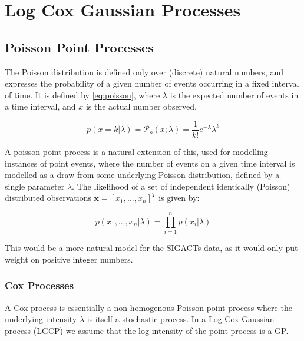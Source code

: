 \documentclass[a4paper,11pt]{report}
\begin{document}

 


\chapter{Log Cox Gaussian Processes}

\section{Poisson Point Processes}
The Poisson distribution is defined only over (discrete) natural numbers, and expresses the probability of a given number of events occurring in a fixed interval of time. It is defined by \ref{eq:poisson}, where \(\lambda\) is the expected number of events in a time interval, and \(x\) is the actual number observed. \cite{Barber}

\begin{equation}\label{eq:poisson}
 p(x=k|\lambda) = \mathcal{P}_o (x;\lambda) = \frac{1}{k!} e^{-\lambda} \lambda^k
\end{equation}

A poisson point process is a natural extension of this, used for modelling instances of point events, where the number of events on a given time interval is modelled as a draw from some underlying Poisson distribution, defined by a single parameter \(\lambda\). \cite{Gregory} The likelihood of a set of independent identically (Poisson) distributed observations \(\mathbf{x}=[x_1,...,x_n]^T\) is given by:

\begin{equation}
p(x_1,...,x_n|\lambda) = \prod_{i=1}^{n} p(x_i|\lambda)
\end{equation}

This would be a more natural model for the SIGACTs data, as it would only put weight on positive integer numbers. 


\subsection{Cox Processes}
A Cox process is essentially a non-homogenous Poisson point process where the underlying intensity \(\lambda\) is itself a stochastic process. In a Log Cox Gaussian process (LGCP) we assume that the log-intensity of the point process is a GP. 
\end{document}
